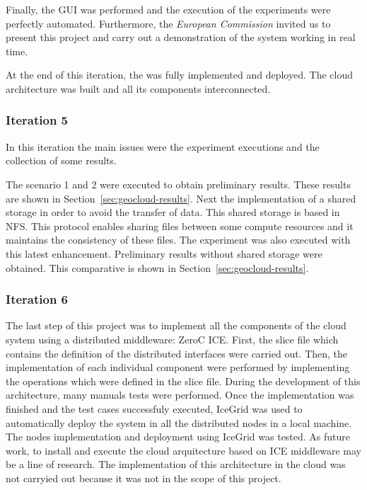 Finally, the \ac{GUI} was performed and the execution of the experiments were
perfectly automated. Furthermore, the \emph{European Commission} invited us to
present this project and carry out a demonstration of the system working in real
time.

At the end of this iteration, the \sss was fully implemented and deployed. The
cloud architecture was built and all its components interconnected.


\subsubsection{Iteration 5}

In this iteration the main issues were the experiment executions and the
collection of some results. 

The scenario 1 and 2 were executed to obtain preliminary results. These results
are shown in Section~\ref{sec:geocloud-results}. Next the implementation of a shared
storage in order to avoid the transfer of data. This
shared storage is based in \ac{NFS}. This protocol enables sharing files between
some compute resources and it maintains the consistency of these files.
The experiment was also executed with this latest enhancement. Preliminary
results without shared storage were obtained. This
comparative is shown in Section~\ref{sec:geocloud-results}.


\subsubsection{Iteration 6} 

The last step of this project was to implement all the components of the cloud system using
a distributed middleware: ZeroC ICE. First, the slice file which contains the
definition of the distributed interfaces were carried out. Then, the
implementation of each individual component were performed by implementing the
operations which were defined in the slice file. During the development of this
architecture, many manuals tests were performed. Once the implementation
was finished and the test cases successfuly executed,  IceGrid was used to
automatically deploy the system in all the distributed nodes in a local machine. The nodes
implementation and deployment using IceGrid was tested. 
As future work, to install and execute the cloud arquitecture based on ICE
middleware may be a line of research. The implementation of this architecture in
the \bonfire cloud was not carryied out because it was not in the scope of this project.
 

